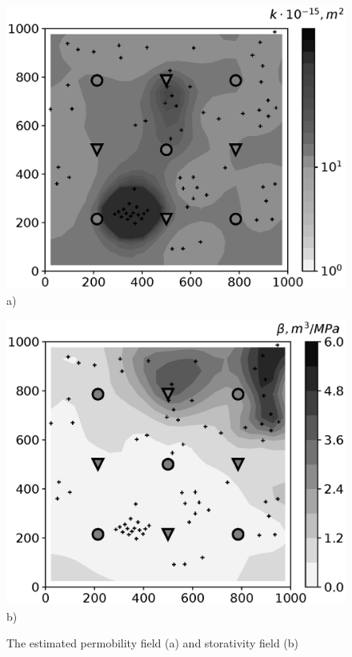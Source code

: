 \documentclass[
11pt,%
tightenlines,%
twoside,%
onecolumn,%
nofloats,%
nobibnotes,%
nofootinbib,%
superscriptaddress,%
noshowpacs,%
centertags]%
{revtex4}
\begin{document}
\begin{figure}
	\begin{minipage}[h]{0.48\linewidth}
		\centering
		\includegraphics[height=0.80\linewidth]{images/fig5a.eps}\\
		a)
		\label{fig:mob}
	\end{minipage} \hfill
	\begin{minipage}[h]{0.48\linewidth}
		\centering
		\includegraphics[height=0.80\linewidth]{images/fig5b.eps} \\
		b)
		\label{fig:comp}
	\end{minipage}
	\caption{The estimated permobility field (a) and storativity field (b)}
\end{figure}
\end{document}
